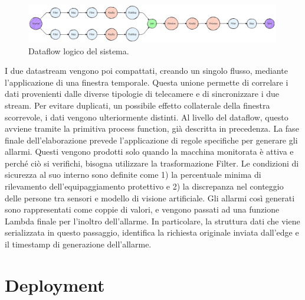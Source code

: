 \vspace{0.5cm}
\begin{figure}[htbp]
    \centering
    \includegraphics[width=0.99\textwidth]{figures/system-logical-dataflow-graph.png}
    \caption{Dataflow logico del sistema.} 
    \label{fig:system-dataflow}
\end{figure}

I due datastream vengono poi compattati, creando un singolo flusso, mediante l'applicazione di una finestra temporale. Questa unione permette di correlare i dati provenienti dalle diverse tipologie di telecamere e di sincronizzare i due stream. Per evitare duplicati, un possibile effetto collaterale della finestra scorrevole, i dati vengono ulteriormente distinti. Al livello del dataflow, questo avviene tramite la primitiva process function, già descritta in precedenza. La fase finale dell'elaborazione prevede l'applicazione di regole specifiche per generare gli allarmi. Questi vengono prodotti solo quando la macchina monitorata è attiva e perché ciò si verifichi, bisogna utilizzare la trasformazione Filter. Le condizioni di sicurezza al suo interno sono definite come 1) la percentuale minima di rilevamento dell'equipaggiamento protettivo e 2) la discrepanza nel conteggio delle persone tra sensori e modello di visione artificiale. Gli allarmi così generati sono rappresentati come coppie di valori, e vengono passati ad una funzione Lambda finale per l'inoltro dell'allarme. In particolare, la struttura dati che viene serializzata in questo passaggio, identifica la richiesta originale inviata dall'edge e il timestamp di generazione dell'allarme.



\section{Deployment}

